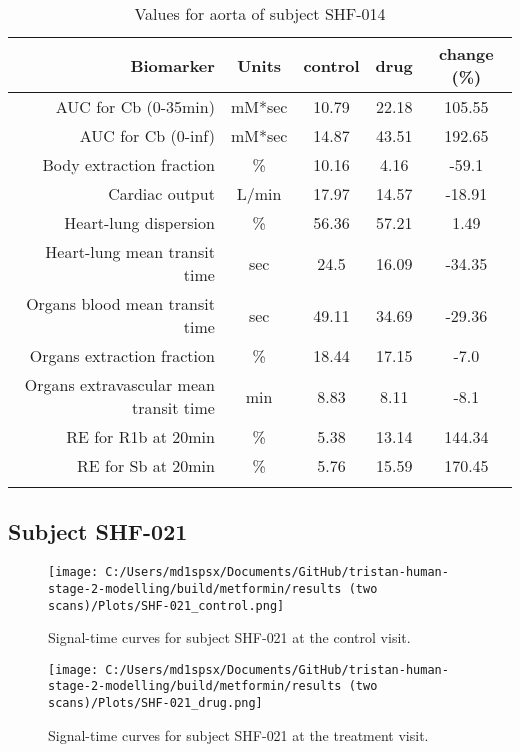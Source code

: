 \documentclass{epflreport}%
\begin{document}
\begin{longtable}{rcccc}%
\hline%
Biomarker&Units&control&drug&change (\%)\\%
\hline%
AUC for Cb (0{-}35min)&mM*sec&10.79&22.18&105.55\\%
AUC for Cb (0{-}inf)&mM*sec&14.87&43.51&192.65\\%
Body extraction fraction&\%&10.16&4.16&{-}59.1\\%
Cardiac output&L/min&17.97&14.57&{-}18.91\\%
Heart{-}lung dispersion&\%&56.36&57.21&1.49\\%
Heart{-}lung mean transit time&sec&24.5&16.09&{-}34.35\\%
Organs blood mean transit time&sec&49.11&34.69&{-}29.36\\%
Organs extraction fraction&\%&18.44&17.15&{-}7.0\\%
Organs extravascular mean transit time&min&8.83&8.11&{-}8.1\\%
RE for R1b at 20min&\%&5.38&13.14&144.34\\%
RE for Sb at 20min&\%&5.76&15.59&170.45\\%
\hline%
\caption{Values for aorta of subject SHF-014} \\%
\end{longtable}%
\clearpage%
\subsection{Subject SHF{-}021}%
\label{subsec:SubjectSHF{-}021}%

%


\begin{figure}[h!]%
\centering%
\texttt{[image: C:/Users/md1spsx/Documents/GitHub/tristan-human-stage-2-modelling/build/metformin/results (two scans)/Plots/SHF-021\_control.png]}%
\caption{Signal{-}time curves for subject SHF{-}021 at the control visit.}%
\end{figure}

%


\begin{figure}[h!]%
\centering%
\texttt{[image: C:/Users/md1spsx/Documents/GitHub/tristan-human-stage-2-modelling/build/metformin/results (two scans)/Plots/SHF-021\_drug.png]}%
\caption{Signal{-}time curves for subject SHF{-}021 at the treatment visit.}%
\end{figure}
\end{document}
